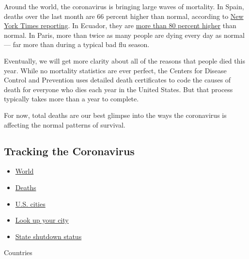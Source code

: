 Around the world, the coronavirus is bringing large waves of mortality.
In Spain, deaths over the last month are 66 percent higher than normal,
according to
\href{https://www.nytimes3xbfgragh.onion/interactive/2020/04/21/world/coronavirus-missing-deaths.html}{New
York Times reporting}. In Ecuador, they are
\href{https://www.nytimes3xbfgragh.onion/2020/04/23/world/americas/ecuador-deaths-coronavirus.html}{more
than 80 percent higher} than normal. In Paris, more than twice as many
people are dying every day as normal --- far more than during a typical
bad flu season.

Eventually, we will get more clarity about all of the reasons that
people died this year. While no mortality statistics are ever perfect,
the Centers for Disease Control and Prevention uses detailed death
certificates to code the causes of death for everyone who dies each year
in the United States. But that process typically takes more than a year
to complete.

For now, total deaths are our best glimpse into the ways the coronavirus
is affecting the normal patterns of survival.

\hypertarget{tracking-the-coronavirus}{%
\subsection{Tracking the Coronavirus}\label{tracking-the-coronavirus}}

\begin{itemize}
\tightlist
\item
  \href{https://www.nytimes3xbfgragh.onion/interactive/2020/world/coronavirus-maps.html}{World}
\item
  \href{https://www.nytimes3xbfgragh.onion/interactive/2020/03/21/upshot/coronavirus-deaths-by-country.html}{Deaths}
\item
  \href{https://www.nytimes3xbfgragh.onion/interactive/2020/04/03/upshot/coronavirus-metro-area-tracker.html}{U.S.
  cities}
\item
  \href{https://www.nytimes3xbfgragh.onion/interactive/2020/04/23/upshot/five-ways-to-monitor-coronavirus-outbreak-us.html}{Look
  up your city}
\item
  \href{https://www.nytimes3xbfgragh.onion/interactive/2020/us/states-reopen-map-coronavirus.html}{State
  shutdown status}
\end{itemize}

Countries

